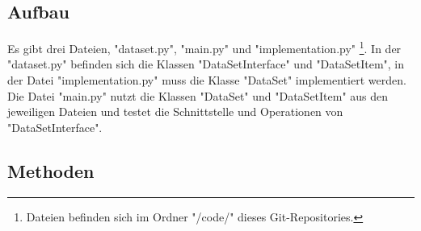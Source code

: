 \documentclass{article}
\begin{document}
		\subsection{Aufbau}

			Es gibt drei Dateien, "dataset.py", "main.py" und "implementation.py" \footnote {Dateien befinden sich im Ordner "/code/" dieses Git-Repositories.}.
			In der "dataset.py" befinden sich die Klassen "DataSetInterface" und "DataSetItem",
			in der Datei "implementation.py" muss die Klasse "DataSet" implementiert werden.
			Die Datei "main.py" nutzt die Klassen "DataSet" und "DataSetItem" aus den jeweiligen Dateien und testet die Schnittstelle und Operationen von "DataSetInterface".\\

		\subsection{Methoden}
\end{document}

